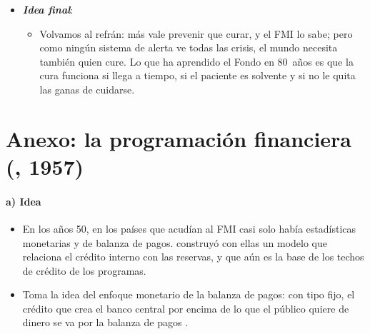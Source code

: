 \documentclass[11pt]{article}
\begin{document}
\begin{itemize}
\begin{itemize}
  \item Pero no puede ser el prestamista de última instancia de  (1873), que en un pánico prestaba «tanto como el público pida»:\footnote{En el original, «as largely as the public ask for them»\nocite{Bagehot1873} (\emph{Lombard Street}, cap.~7).} no crea dinero ni puede pedir garantías a un Estado, así que presta con límite y con condiciones.
  \item Su gran tarea pendiente es la legitimidad: unas cuotas que reflejen la economía mundial de hoy.
  \end{itemize}
\item \textbf{\emph{Idea final}}:
  \begin{itemize}
  \item Volvamos al refrán: más vale prevenir que curar, y el FMI lo sabe; pero como ningún sistema de alerta ve todas las crisis, el mundo necesita también quien cure. Lo que ha aprendido el Fondo en 80~años es que la cura funciona si llega a tiempo, si el paciente es solvente y si no le quita las ganas de cuidarse.
  \end{itemize}
\end{itemize}

\clearpage
\appendix

\section{Anexo: la programación financiera (, 1957)}\label{anexo:polak}

\paragraph{a) Idea}

\begin{itemize}
\item En los años 50, en los países que acudían al FMI casi solo había estadísticas monetarias y de balanza de pagos. \textcite{Polak1957} construyó con ellas un modelo que relaciona el crédito interno con las reservas, y que aún es la base de los techos de crédito de los programas\nocite{Polak1998}.
\item Toma la idea del enfoque monetario de la balanza de pagos: con tipo fijo, el crédito que crea el banco central por encima de lo que el público quiere de dinero se va por la balanza de pagos .
\end{itemize}
\end{document}
